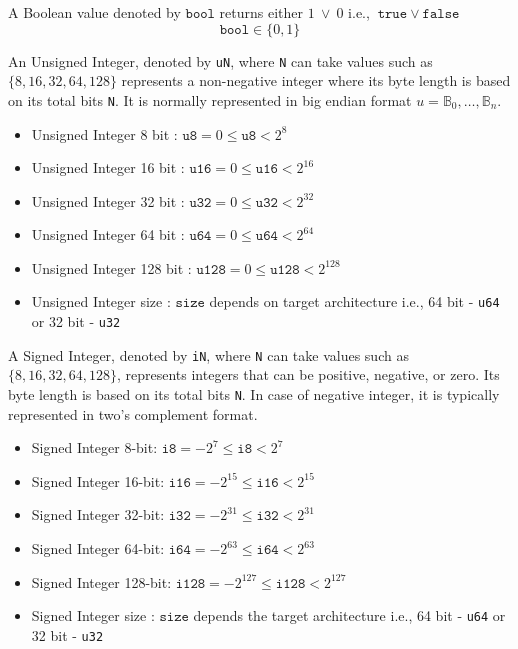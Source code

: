 \documentclass[../alan-handbook.tex]{subfiles}
\begin{document}
 \label{Bool}

A Boolean value denoted by $\texttt{bool}$ returns either $1 \ \vee \ 0$ i.e., $\texttt{true} \ \vee \ \texttt{false}$
$$\texttt{bool} \in  \{0,1\}$$
 \label{Unsigned-Integer}

An Unsigned Integer, denoted by \texttt{uN}, where \texttt{N} can take values such as $\{8,16,32,64,128\}$ represents a non-negative integer where its byte length is based on its total bits \texttt{N}. It is normally represented in big endian format $u={\mathbb{B}_0,\ldots,\mathbb{B}_n}$. 

\begin{itemize}
    \item Unsigned Integer 8 bit : $ \texttt{u8} = 0 \leq \texttt{u8} < {2^{8}}$
    \item Unsigned Integer 16 bit : $ \texttt{u16} = 0 \leq \texttt{u16} < 2^{16}$
    \item Unsigned Integer 32 bit : $ \texttt{u32} = 0 \leq \texttt{u32} < 2^{32}$
    \item Unsigned Integer 64 bit : $ \texttt{u64} = 0 \leq \texttt{u64} < 2^{64}$
    \item Unsigned Integer 128 bit : $ \texttt{u128} = 0 \leq \texttt{u128} < 2^{128}$
    \item Unsigned Integer size : $\texttt{size}$ depends on target architecture i.e., 64 bit - \texttt{u64} or 32 bit - \texttt{u32}
\end{itemize}

 \label{Signed-Integer}

A Signed Integer, denoted by \texttt{iN}, where \texttt{N} can take values such as $\{8,16,32,64,128\}$, represents integers that can be positive, negative, or zero. Its byte length is based on its total bits \texttt{N}. In case of negative integer, it is typically represented in two's complement format.

\begin{itemize}
    \item Signed Integer 8-bit: $  \texttt{i8} = -2^{7} \leq \texttt{i8} < 2^{7}$
    \item Signed Integer 16-bit: $ \texttt{i16} = -2^{15} \leq \texttt{i16} < 2^{15}$
    \item Signed Integer 32-bit: $ \texttt{i32} = -2^{31} \leq \texttt{i32} < 2^{31}$
    \item Signed Integer 64-bit: $ \texttt{i64} = -2^{63} \leq \texttt{i64} < 2^{63}$
    \item Signed Integer 128-bit: $ \texttt{i128} = -2^{127} \leq \texttt{i128} < 2^{127}$
    \item Signed Integer size : $\texttt{size}$ depends the target architecture i.e., 64 bit - \texttt{u64} or 32 bit - \texttt{u32}
\end{itemize}
\end{document}
